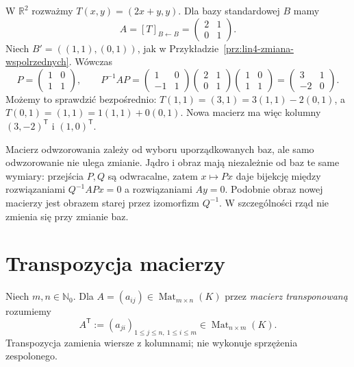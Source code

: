 \begin{przyklad}
\label{prz:lin4-podobienstwo}
W \(\mathbb R^2\) rozważmy
\(T(x,y)=(2x+y,y)\).
Dla bazy standardowej \(B\) mamy
\[
 A=[T]_{B\leftarrow B}
 =\begin{pmatrix}2&1\\0&1\end{pmatrix}.
\]
Niech \(B'=((1,1),(0,1))\), jak w
Przykładzie~\ref{prz:lin4-zmiana-wspolrzednych}.
Wówczas
\[
 P=\begin{pmatrix}1&0\\1&1\end{pmatrix},
 \qquad
 P^{-1}AP
 =\begin{pmatrix}1&0\\-1&1\end{pmatrix}
  \begin{pmatrix}2&1\\0&1\end{pmatrix}
  \begin{pmatrix}1&0\\1&1\end{pmatrix}
 =\begin{pmatrix}3&1\\-2&0\end{pmatrix}.
\]
Możemy to sprawdzić bezpośrednio:
\(T(1,1)=(3,1)=3(1,1)-2(0,1)\),
a \(T(0,1)=(1,1)=1(1,1)+0(0,1)\).
Nowa macierz ma więc kolumny
\((3,-2)^{\mathsf T}\) i \((1,0)^{\mathsf T}\).
\end{przyklad}

\begin{uwaga}
\label{rem:lin4-niezmienniki}
Macierz odwzorowania zależy od wyboru
uporządkowanych baz, ale samo odwzorowanie
nie ulega zmianie. Jądro i obraz mają
niezależnie od baz te same wymiary:
przejścia \(P,Q\) są odwracalne,
zatem \(x\mapsto Px\) daje bijekcję
między rozwiązaniami \(Q^{-1}APx=0\)
a rozwiązaniami \(Ay=0\).
Podobnie obraz nowej macierzy
jest obrazem starej przez izomorfizm \(Q^{-1}\).
W szczególności rząd nie zmienia się
przy zmianie baz.
\end{uwaga}

\section{Transpozycja macierzy}
\label{sec:lin4-transpozycja}

\begin{definicja}
\label{def:lin4-transpozycja}
Niech \(m,n\in\mathbb N_0\).
Dla \(A=(a_{ij})\in\operatorname{Mat}_{m\times n}(K)\)
przez \emph{macierz transponowaną} rozumiemy
\[
 A^{\mathsf T}:=(a_{ji})_{1\leq j\leq n,\ 1\leq i\leq m}
 \in\operatorname{Mat}_{n\times m}(K).
\]
Transpozycja zamienia wiersze z kolumnami;
nie wykonuje sprzężenia zespolonego.
\end{definicja}

